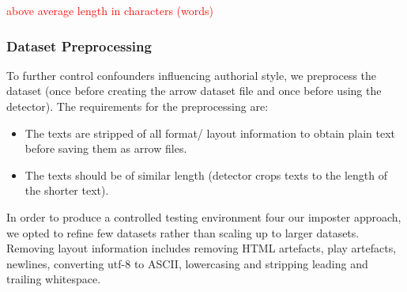 \begin{table}[h]
\centering\small
\caption{Statistics of preprocessed datasets \dataPan{}, \dataBlog{} and \dataGutenberg{}.}
\label{tab:data_stats}
\end{table}
\textcolor{red}{above average length in characters (words)}


\subsubsection{Dataset Preprocessing}
\label{subsubsec:dataset_preprocessing}

To further control confounders influencing authorial style, we preprocess the dataset 
(once before creating the arrow dataset file and once before using the detector).
The requirements for the preprocessing are:
\begin{itemize}
    \item The texts are stripped of all format/ layout information to obtain plain text before saving them as arrow files.
    \item The texts should be of similar length (detector crops texts to the length of the shorter text).
\end{itemize}
In order to produce a controlled testing environment four our imposter approach, 
we opted to refine few datasets rather than scaling up to larger datasets.
Removing layout information includes removing HTML artefacts, play artefacts, newlines, 
converting utf-8 to ASCII, lowercasing and stripping leading and trailing whitespace.

